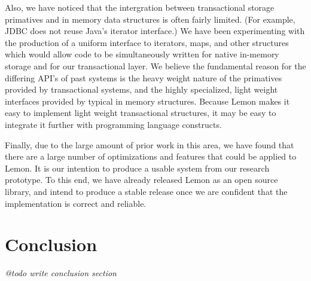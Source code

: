 \documentclass[letterpaper,twocolumn,english]{article}
\newcommand{\yad}{Lemon\xspace}
\begin{document}
Also, we have noticed that the intergration between transactional
storage primatives and in memory data structures is often fairly
limited.  (For example, JDBC does not reuse Java's iterator
interface.)  We have been experimenting with the production of a
uniform interface to iterators, maps, and other structures which would
allow code to be simultaneously written for native in-memory storage
and for our transactional layer.  We believe the fundamental reason
for the differing API's of past systems is the heavy weight nature of
the primatives provided by transactional systems, and the highly
specialized, light weight interfaces provided by typical in memory
structures.  Because \yad makes it easy to implement light weight
transactional structures, it may be easy to integrate it further with
programming language constructs.

Finally, due to the large amount of prior work in this area, we have
found that there are a large number of optimizations and features that
could be applied to \yad.  It is our intention to produce a usable
system from our research prototype.  To this end, we have already
released \yad as an open source library, and intend to produce a
stable release once we are confident that the implementation is correct
and reliable.  


\section{Conclusion}

{\em @todo write conclusion section}
\end{document}
